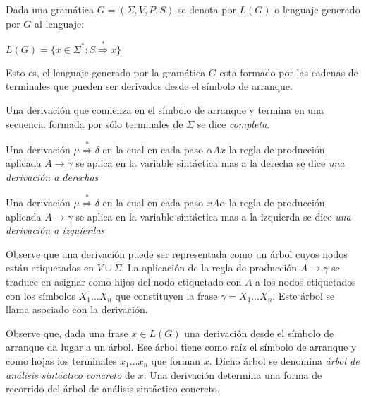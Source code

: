 \begin{definition}
\label{definition:lenguajegenerado}
Dada una gramática $G=(\Sigma,V,P,S)$ se denota por $L(G)$ o lenguaje
generado por $G$ al lenguaje:

\begin{center}
$L(G) = \{ x \in \Sigma^* : S \stackrel{*}{\Longrightarrow} x \}$
\end{center}

Esto es, el lenguaje generado por la gramática $G$ esta formado por las cadenas
de terminales que pueden ser derivados desde el símbolo de arranque.
\end{definition}

\begin{definition}
Una derivación que comienza en el símbolo de arranque y termina en una secuencia
formada por sólo terminales de $\Sigma$ se dice \emph{completa}.

Una derivación $\mu  \stackrel{*}{\Longrightarrow}  \delta$ 
en la cual en cada paso $\alpha A x$ la regla de producción aplicada $A \rightarrow \gamma$
se aplica en la variable sintáctica mas a la derecha se dice \emph{una derivación a derechas}

Una derivación $\mu  \stackrel{*}{\Longrightarrow}  \delta$ 
en la cual en cada paso $x A \alpha$ la regla de producción aplicada $A \rightarrow \gamma$
se aplica en la variable sintáctica mas a la izquierda se dice \emph{una derivación a izquierdas}
\end{definition}

\begin{definition}
Observe que una derivación puede ser representada como un árbol cuyos nodos
están etiquetados en $V \cup \Sigma$. La aplicación de la regla de 
producción $A \rightarrow \gamma$ se traduce en asignar como hijos del nodo etiquetado con $A$
a los nodos etiquetados con los símbolos $X_1 \ldots X_n$ que constituyen
la frase $\gamma = X_1 \ldots X_n$.  
Este árbol se llama  asociado 
con la derivación.
\end{definition}

\begin{definition}
\label{definition:arbolconcreto}
Observe que, dada una frase $x \in L(G)$ una derivación desde el
símbolo de arranque da lugar a  un árbol. Ese árbol tiene como raíz el 
símbolo de arranque y como hojas los terminales 
$x_1 \ldots x_n$ que forman $x$. Dicho árbol se denomina \emph{árbol
de análisis sintáctico concreto} de $x$. Una derivación determina
una forma de recorrido del árbol de análisis sintáctico concreto.
\end{definition}

